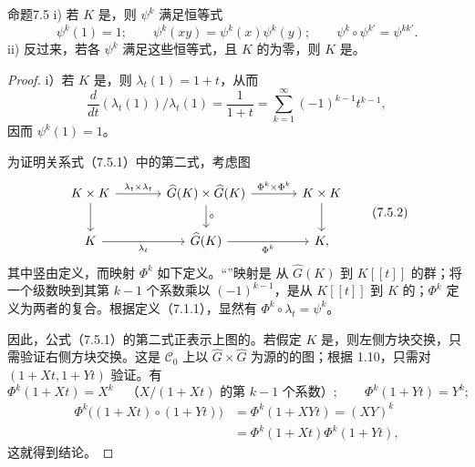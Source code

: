 \begin{SGAresult}{命题}{7.5}
\textup{i)} 若 $K$ 是，则 $\psi^k$ 满足恒等式
\[
\psi^k(1)=1;\qquad
\psi^k(xy)=\psi^k(x)\psi^k(y);\qquad
\psi^k\circ\psi^{k'}=\psi^{kk'}.
\tag{7.5.1}
\]
\textup{ii)} 反过来，若各 $\psi^k$ 满足这些恒等式，且 $K$ 的为零，则 $K$ 是。
\end{SGAresult}
\begin{proof}
i）若 $K$ 是，则 $\lambda_t(1)=1+t$，从而
\[
\frac{d}{dt}(\lambda_t(1))/\lambda_t(1)
 =\frac{1}{1+t}
 =\sum_{k=1}^{\infty}(-1)^{k-1}t^{k-1},
\]
因而 $\psi^k(1)=1$。

为证明关系式（7.5.1）中的第二式，考虑图
\[
\begin{tikzcd}[column sep=large]
K\times K \arrow[r,"\lambda_t\times\lambda_t"] \arrow[d] &
 \widehat G(K)\times\widehat G(K)
 \arrow[r,"\Phi^k\times\Phi^k"] \arrow[d,"\circ"] &
 K\times K \arrow[d]\\
K \arrow[r,"\lambda_t"'] &
 \widehat G(K) \arrow[r,"\Phi^k"'] & K,
\end{tikzcd}
\tag{7.5.2}
\]
其中竖由定义，而映射 $\Phi^k$ 如下定义。“”映射是
从 $\widehat G(K)$ 到 $K[[t]]$ 的群；将一个级数映到其第 $k-1$ 个系数乘以 $(-1)^{k-1}$，是从 $K[[t]]$ 到 $K$ 的；$\Phi^k$ 定义为两者的复合。根据定义（7.1.1），显然有 $\Phi^k\circ\lambda_t=\psi^k$。

因此，公式（7.5.1）的第二式正表示上图的。若假定 $K$ 是，则左侧方块交换，只需验证右侧方块交换。这是 $\mathscr C_0$ 上以 $\widehat G\times\widehat G$ 为源的的图；根据 1.10，只需对 $(1+Xt,1+Yt)$ 验证。有
\[
\Phi^k(1+Xt)=X^k
 \quad\text{（$X/(1+Xt)$ 的第 $k-1$ 个系数）};
\qquad \Phi^k(1+Yt)=Y^k;
\]
\[
\begin{aligned}
\Phi^k\bigl((1+Xt)\circ(1+Yt)\bigr)
 &=\Phi^k(1+XYt)=(XY)^k\\
 &=\Phi^k(1+Xt)\Phi^k(1+Yt),
\end{aligned}
\]
这就得到结论。


\end{proof}
